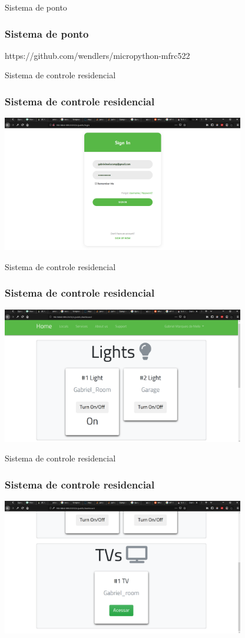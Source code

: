 \documentclass[10pt, compress]{beamer}
\begin{document}
\begin{frame}{Sistema de ponto}
  \frametitle{Sistema de ponto}
  https://github.com/wendlers/micropython-mfrc522
\end{frame}

\begin{frame}{Sistema de controle residencial}
  \frametitle{Sistema de controle residencial}

    \hfill\includegraphics[width=300pt]{images/iot-server_login.png}\hspace*{\fill}
\end{frame}

\begin{frame}{Sistema de controle residencial}
  \frametitle{Sistema de controle residencial}
  \begin{center}
    \includegraphics[width=300pt]{images/iot-server_dash1.png}
  \end{center}
\end{frame}

\begin{frame}{Sistema de controle residencial}
  \frametitle{Sistema de controle residencial}
  \begin{center}
    \includegraphics[width=300pt]{images/iot-server_dash2.png}
  \end{center}
\end{frame}
\end{document}

